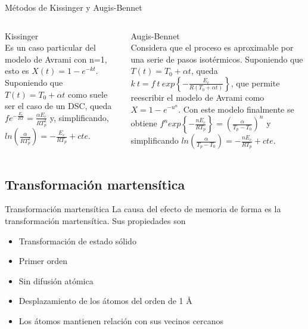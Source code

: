 \documentclass[11pt]{beamer}
\begin{document}
		\begin{frame}{Métodos de Kissinger y Augis-Bennet}
			\begin{columns}
				\begin{column}{.49\textwidth}
					Kissinger \\ Es un caso particular del modelo de Avrami con n=1, esto es $X(t) = 1 - e^{-kt}$. Suponiendo que $T(t) = T_0+\alpha t$ como suele ser el caso de un DSC, queda $fe^{-\frac{E_c}{RT}} = \frac{\alpha E_c}{R T_p^2}$ y, simplificando, $ln(\frac{\alpha}{R T_p^2}) = -\frac{E_c}{RT_p} + cte$.
				\end{column}
				\begin{column}{.49\textwidth}
				Augis-Bennet\\
				Considera que el proceso es aproximable por una serie de pasos isotérmicos. Suponiendo que $T(t) = T_0+\alpha t$, queda $k\: t = f\: t\: exp \left\lbrace -\frac{E_c}{R(T_0 + \alpha t)} \right\rbrace$, que permite reescribir el modelo de Avrami como $X = 1-e^{-u^{n}}$. Con este modelo finalmente se obtiene $f^n exp \left\lbrace -\frac{n E_c}{RT_p} \right\rbrace = (\frac{\alpha}{T_p - T_0})^n$  y simplificando $ln(\frac{\alpha}{T_p - T_0}) = -\frac{n E_c}{RT_p} + cte$.
				\end{column}
			\end{columns}
		\end{frame}	
		
		
	\subsection{Transformación martensítica}
		\begin{frame}{Transformación martensítica}
			La causa del efecto de memoria de forma es la transformación martensítica.
			Sus propiedades son
			\begin{itemize}
				\item Transformación de estado sólido
				\item Primer orden
				\item Sin difusión atómica
				\item Desplazamiento de los átomos del orden de 1 \AA
				\item Los átomos mantienen relación con sus vecinos cercanos
			\end{itemize}
		\end{frame}
		
\end{document}
